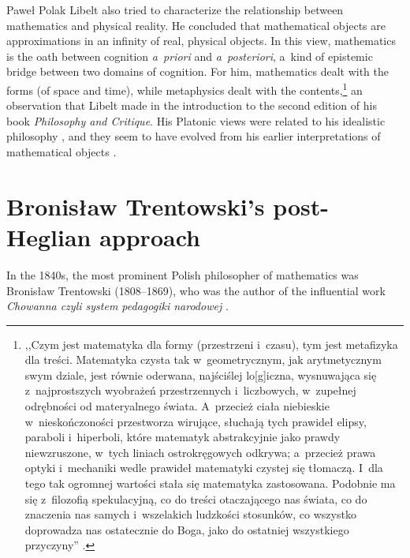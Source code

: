 \begin{artengenv}{Paweł Polak}
Libelt also tried to characterize the relationship between mathematics and physical reality. He concluded that mathematical objects are approximations in an infinity of real, physical objects. In this view, mathematics is the oath between cognition \textit{a~priori} and \textit{a~posteriori}, a~kind of epistemic bridge between two domains of cognition. For him, mathematics dealt with the forms (of space and time), while metaphysics dealt with the contents,\footnote{,,Czym jest matematyka dla formy (przestrzeni i~czasu), tym jest metafizyka dla treści. Matematyka czysta tak w~geometrycznym, jak arytmetycznym swym dziale, jest równie oderwana, najściślej lo[g]iczna, wysnuwająca się z~najprostszych wyobrażeń przestrzennych i~liczbowych, w~zupełnej odrębności od materyalnego świata. A~przecież ciała niebieskie w~nieskończoności przestworza wirujące, słuchają tych prawideł elipsy, paraboli i~hiperboli, które matematyk abstrakcyjnie jako prawdy niewzruszone, w~tych liniach ostrokręgowych odkrywa; a~przecież prawa optyki i~mechaniki wedle prawideł matematyki czystej się tłomaczą. I~dla tego tak ogromnej wartości stała się matematyka zastosowana. Podobnie ma się z~filozofią spekulacyjną, co do treści otaczającego nas świata, co do znaczenia nas samych i~wszelakich ludzkości stosunków, co wszystko doprowadza nas ostatecznie do Boga, jako do ostatniej wszystkiego przyczyny''
\parencite[][p.IX]{libelt_filozofia_1874}.%
} an observation that Libelt made in the introduction to the second edition of his book \textit{Philosophy and Critique}. His Platonic views were related to his idealistic philosophy 
\parencite[][p.95]{libelt_filozofia_1874}, %
 and they seem to have evolved from his earlier interpretations of mathematical objects 
\parencite[][]{libelt_filozofia_1842}.%


\section*{Bronisław Trentowski's post-Heglian approach}

In the 1840s, the most prominent Polish philosopher of mathematics was Bronisław Trentowski (1808–1869), who was the author of the influential work \textit{Chowanna czyli system pedagogiki narodowej}
\parencites[][]{trentowski_chowanna_1842}[][]{trentowski_chowanna_1842-1}.%



\end{artengenv}
